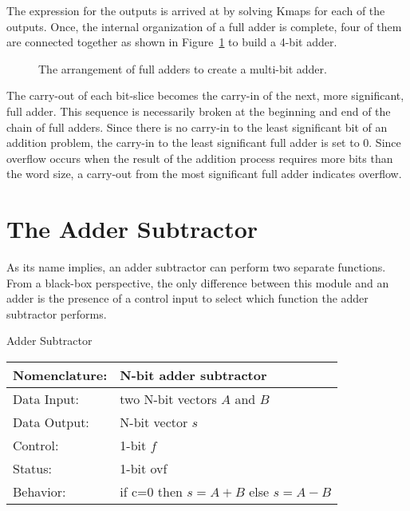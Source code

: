 The \SOPmin expression for the outputs is arrived at by
solving Kmaps for each of the outputs.  Once, the internal
organization of a full adder is complete, four of them
are connected together as shown in Figure~\ref{fig:comboBBadder}
to build a 4-bit adder.

\begin{figure}[ht]
\caption{The arrangement of full adders to create a multi-bit
adder.}
\label{fig:comboBBadder}
\end{figure}
\label{page:add}

The carry-out of each bit-slice becomes the carry-in of the
next, more significant, full adder.  This sequence is necessarily
broken at the beginning and end of the chain of full 
adders.  Since there is no carry-in to the least significant
bit of an addition problem, the carry-in to the least significant
full adder is set to 0.  Since overflow occurs when the result 
of the addition process requires more bits than the word size, a 
carry-out from the most significant full adder indicates overflow.

\section{The Adder Subtractor}

As its name implies, an adder subtractor can perform two separate
functions.  From a black-box perspective, the only difference between
this module and an adder is the presence of a control input to select
which function the adder subtractor performs.
 
\begin{buildingblock}{Adder Subtractor}
\label{buildingblock:adderSubtractor}
\begin{tabular}{|l|p{3.5in}|} \hline
Nomenclature:  & N-bit adder subtractor                 \\ \hline
Data Input:    & two N-bit vectors $A$ and $B$           \\ \hline  
Data Output:   & N-bit vector  $s$               \\ \hline
Control:       & 1-bit $f$                     \\ \hline
Status:        & 1-bit ovf 				\\ \hline
Behavior:      & if c=0 then $s = A+B$ else $s=A-B$     \\ \hline
\end{tabular}
\end{buildingblock}

